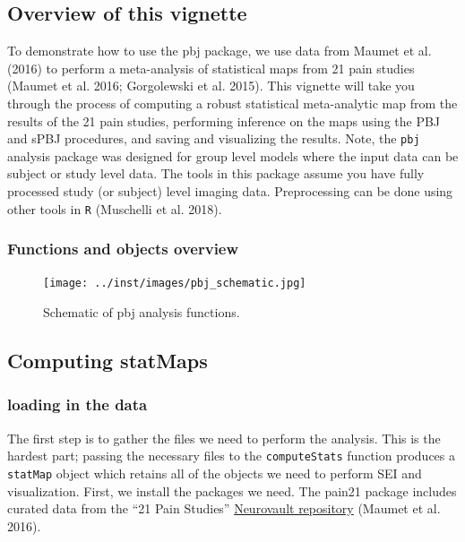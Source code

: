 \documentclass[]{article}
\begin{document}
\subsection{Overview of this vignette}\label{overview-of-this-vignette}

To demonstrate how to use the pbj package, we use data from Maumet et
al. (2016) to perform a meta-analysis of statistical maps from 21 pain
studies (Maumet et al. 2016; Gorgolewski et al. 2015). This vignette
will take you through the process of computing a robust statistical
meta-analytic map from the results of the 21 pain studies, performing
inference on the maps using the PBJ and sPBJ procedures, and saving and
visualizing the results. Note, the \texttt{pbj} analysis package was
designed for group level models where the input data can be subject or
study level data. The tools in this package assume you have fully
processed study (or subject) level imaging data. Preprocessing can be
done using other tools in \texttt{R} (Muschelli et al. 2018).

\subsubsection{Functions and objects
overview}\label{functions-and-objects-overview}

\begin{figure}
\centering
\texttt{[image: ../inst/images/pbj\_schematic.jpg]}
\caption{Schematic of pbj analysis functions.}
\end{figure}

\subsection{Computing statMaps}\label{computing-statmaps}

\subsubsection{loading in the data}\label{loading-in-the-data}

The first step is to gather the files we need to perform the analysis.
This is the hardest part; passing the necessary files to the
\texttt{computeStats} function produces a \texttt{statMap} object which
retains all of the objects we need to perform SEI and visualization.
First, we install the packages we need. The pain21 package includes
curated data from the ``21 Pain Studies''
\href{https://neurovault.org/collections/1425/}{Neurovault repository}
(Maumet et al. 2016).
\end{document}
